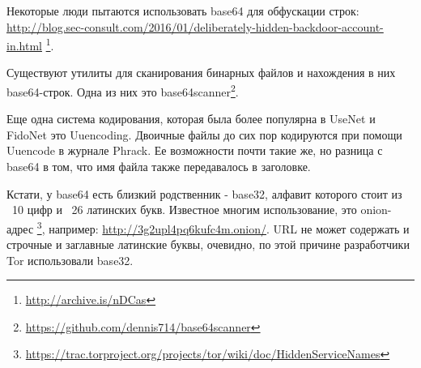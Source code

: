 Некоторые люди пытаются использовать base64 для обфускации строк:
\url{http://blog.sec-consult.com/2016/01/deliberately-hidden-backdoor-account-in.html}
\footnote{\url{http://archive.is/nDCas}}.

Существуют утилиты для сканирования бинарных файлов и нахождения в них base64-строк.
Одна из них это base64scanner\footnote{\url{https://github.com/dennis714/base64scanner}}.

Еще одна система кодирования, которая была более популярна в UseNet и FidoNet это Uuencoding.
Двоичные файлы до сих пор кодируются при помощи Uuencode в журнале Phrack.
Ее возможности почти такие же, но разница с base64 в том, что имя файла также передавалось в заголовке.

Кстати, у base64 есть близкий родственник - base32, алфавит которого стоит из ~10 цифр и ~26 латинских букв.
Известное многим использование, это onion-адрес
\footnote{\url{https://trac.torproject.org/projects/tor/wiki/doc/HiddenServiceNames}},
например: \url{http://3g2upl4pq6kufc4m.onion/}.
\ac{URL} не может содержать и строчные и заглавные латинские буквы, очевидно, по этой причине разработчики Tor
использовали base32.

